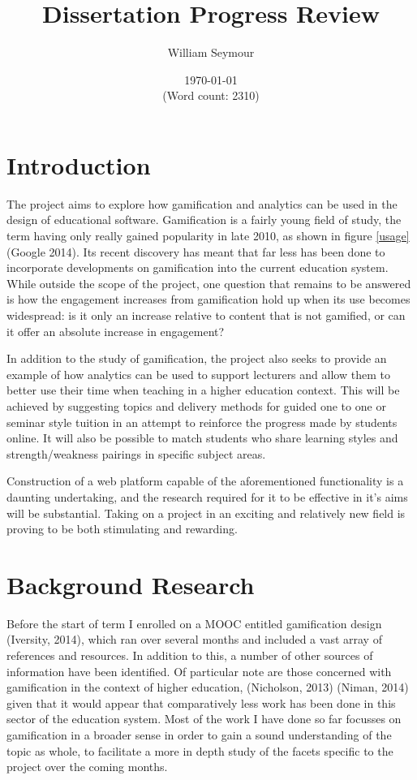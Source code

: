\documentclass[10pt,a4paper]{report}
\author{William Seymour}
\title{Dissertation Progress Review}
\date{\today \\ (Word count: 2310)}
\begin{document}
\maketitle

\section*{Introduction}
The project aims to explore how gamification and analytics can be used in the design of educational software. Gamification is a fairly young field of study, the term having only really gained popularity in late 2010, as shown in figure \ref{usage} (Google 2014). Its recent discovery has meant that far less has been done to incorporate developments on gamification into the current education system. While outside the scope of the project, one question that remains to be answered is how the engagement increases from gamification hold up when its use becomes widespread: is it only an increase relative to content that is not gamified, or can it offer an absolute increase in engagement?

In addition to the study of gamification, the project also seeks to provide an example of how analytics can be used to support lecturers and allow them to better use their time when teaching in a higher education context. This will be achieved by suggesting topics and delivery methods for guided one to one or seminar style tuition in an attempt to reinforce the progress made by students online. It will also be possible to match students who share learning styles and strength/weakness pairings in specific subject areas.

Construction of a web platform capable of the aforementioned functionality is a daunting undertaking, and the research required for it to be effective in it's aims will be substantial. Taking on a project in an exciting and relatively new field is proving to be both stimulating and rewarding.

\section*{Background Research}
Before the start of term I enrolled on a MOOC entitled gamification design (Iversity, 2014), which ran over several months and included a vast array of references and resources. In addition to this, a number of other sources of information have been identified. Of particular note are those concerned with gamification in the context of higher education, (Nicholson, 2013) (Niman, 2014) given that it would appear that comparatively less work has been done in this sector of the education system. Most of the work I have done so far focusses on gamification in a broader sense in order to gain a sound understanding of the topic as whole, to facilitate a more in depth study of the facets specific to the project over the coming months.
\end{document}
